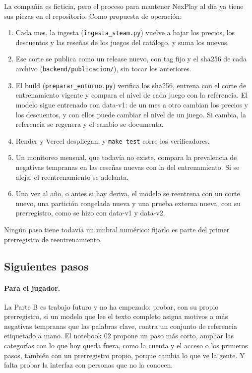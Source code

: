 La compañía es ficticia, pero el proceso para mantener NexPlay al día ya tiene sus piezas en el
repositorio. Como propuesta de operación:
\begin{enumerate}
  \item Cada mes, la ingesta (\texttt{ingesta\_steam.py}) vuelve a bajar los precios, los
  descuentos y las reseñas de los juegos del catálogo, y suma los nuevos.
  \item Ese corte se publica como un release nuevo, con tag fijo y el sha256 de cada archivo
  (\texttt{backend/publicacion/}), sin tocar los anteriores.
  \item El build (\texttt{preparar\_entorno.py}) verifica los sha256, entrena con el corte de
  entrenamiento vigente y compara el nivel de cada juego con la referencia. El modelo sigue
  entrenado con data-v1: de un mes a otro cambian los precios y los descuentos, y con ellos puede
  cambiar el nivel de un juego. Si cambia, la referencia se regenera y el cambio se documenta.
  \item Render y Vercel despliegan, y \texttt{make test} corre los verificadores.
  \item Un monitoreo mensual, que todavía no existe, compara la prevalencia de negativas tempranas en
  las reseñas nuevas con la del entrenamiento. Si se aleja, el reentrenamiento se adelanta.
  \item Una vez al año, o antes si hay deriva, el modelo se reentrena con un corte nuevo, una
  partición congelada nueva y una prueba externa nueva, con su prerregistro, como se hizo con
  data-v1 y data-v2.
\end{enumerate}
Ningún paso tiene todavía un umbral numérico: fijarlo es parte del primer prerregistro de
reentrenamiento.

\subsection{Siguientes pasos}\label{sec:siguientes}

\paragraph{Para el jugador.} La Parte B es trabajo futuro y no ha empezado: probar, con su propio
prerregistro, si un modelo que lee el texto completo asigna motivos a más negativas tempranas que
las palabras clave, contra un conjunto de referencia etiquetado a mano. El notebook 02 propone un
paso más corto, ampliar las categorías con lo que hoy queda fuera, como la cuenta y el acceso o los
primeros pasos, también con un prerregistro propio, porque cambia lo que ve la gente. Y falta
probar la interfaz con personas que no la conocen.


